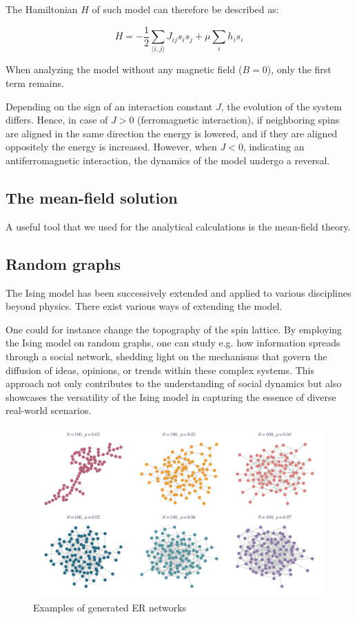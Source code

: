 \documentclass[11pt,a4paper]{article}
\begin{document}
The Hamiltonian $H$ of such model can therefore be described as:

\begin{equation}
    H = -\frac12\sum_{\langle i,j \rangle} J_{ij} s_i s_j + \mu\sum_i h_i s_i
\end{equation}

When analyzing the model without any magnetic field ($B=0$), only the first term remains.

Depending on the sign of an interaction constant $J$, the evolution of the system differs. Hence, in case of $J>0$ (ferromagnetic interaction), if neighboring spins are aligned in the same direction the energy is lowered, and if they are aligned oppositely the energy is increased. However, when $J<0$, indicating an antiferromagnetic interaction, the dynamics of the model undergo a reversal.

\subsection{The mean-field solution}

A useful tool that we used for the analytical calculations is the mean-field theory. 

\subsection{Random graphs}

The Ising model has been successively extended and applied to various disciplines beyond physics. There exist various ways of extending the model.

One could for instance change the topography of the spin lattice. By employing the Ising model on random graphs, one can study e.g. how information spreads through a social network, shedding light on the mechanisms that govern the diffusion of ideas, opinions, or trends within these complex systems. This approach not only contributes to the understanding of social dynamics but also showcases the versatility of the Ising model in capturing the essence of diverse real-world scenarios.

\begin{figure}[ht!]
    \centering
    \includegraphics[width=\linewidth]{../figures/ER_graph.pdf}
    \caption{Examples of generated ER networks}
\end{figure}
\end{document}
